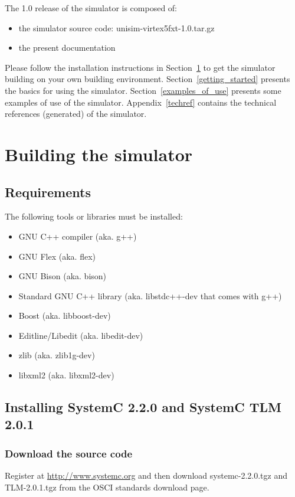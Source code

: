 \noindent The 1.0 release of the simulator is composed of:
\begin{itemize}
\item the simulator source code: unisim-virtex5fxt-1.0.tar.gz
\item the present documentation
\end{itemize}

Please follow the installation instructions in Section~\ref{building_simulator} to get the simulator building on your own building environment.
Section~\ref{getting_started} presents the basics for using the simulator.
Section~\ref{examples_of_use} presents some examples of use of the simulator.
Appendix~\ref{techref} contains the technical references (generated) of the simulator.

\section{Building the simulator}
\label{building_simulator}

\subsection{Requirements}

\noindent The following tools or libraries must be installed:
\begin{itemize}
\item GNU C++ compiler (aka. g++)
\item GNU Flex (aka. flex)
\item GNU Bison (aka. bison)
\item Standard GNU C++ library (aka. libstdc++-dev that comes with g++)
\item Boost (aka. libboost-dev)
\item Editline/Libedit (aka. libedit-dev)
\item zlib (aka. zlib1g-dev)
\item libxml2 (aka. libxml2-dev)
\end{itemize}

\subsection{Installing SystemC 2.2.0 and SystemC TLM 2.0.1}
\subsubsection{Download the source code}
Register at \url{http://www.systemc.org} and then download systemc-2.2.0.tgz and TLM-2.0.1.tgz from the OSCI standards download page.

